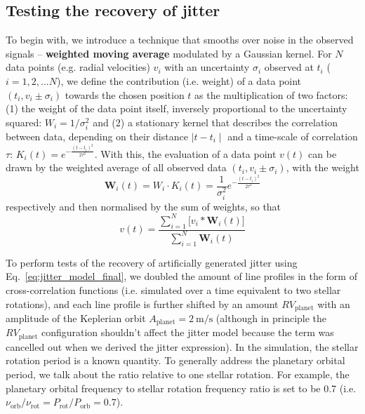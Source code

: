 \subsection{Testing the recovery of jitter}
\label{sec:check}

To begin with, we introduce a technique that smooths over noise in the observed signals -- \textbf{weighted moving average} modulated by a Gaussian kernel. For $N$ data points (e.g. radial velocities) $v_i$ with an uncertainty $\sigma_i$ observed at $t_i$ ($i=1,2,...N$), we define the contribution (i.e. weight) of a data point $(t_i, v_i\pm \sigma_i)$ towards the chosen position $t$ as the multiplication of two factors: (1) the weight of the data point itself, inversely proportional to the uncertainty squared: $W_i= 1/{\sigma_i^2}$ and (2) a stationary kernel that describes the correlation between data, depending on their distance $\mid t-t_i \mid$ and a time-scale of correlation $\tau$: $K_i(t) = e^{-\frac{(t-t_i)^2}{2\tau^2}}$. With this, the evaluation of a data point $v(t)$ can be drawn by the weighted average of all observed data $(t_i, v_i\pm \sigma_i)$, with the weight 
\begin{equation}
	\textbf{W}_i(t) = W_i \cdot K_i(t) = \frac{1}{\sigma_i^2} e^{-\frac{(t-t_i)^2}{2\tau^2}}
\end{equation}
respectively and then normalised by the sum of weights, so that 
\begin{equation}
	v(t) 	=  \frac{\sum\limits_{i=1}^{N} \bigg[v_i*\textbf{W}_i(t)\bigg]}{\sum\limits_{i=1}^{N} \textbf{W}_i(t)}
\end{equation}


To perform tests of the recovery of artificially generated jitter using Eq.~\ref{eq:jitter_model_final}, we doubled the amount of line profiles in the form of cross-correlation functions (i.e. simulated over a time equivalent to two stellar rotations), and each line profile is further shifted by an amount $RV_\text{planet}$ with an amplitude of the Keplerian orbit $A_\text{planet} = 2~\text{m/s}$ (although in principle the $RV_\text{planet}$ configuration shouldn't affect the jitter model because the term was cancelled out when we derived the jitter expression). In the simulation, the stellar rotation period is a known quantity. To generally address the planetary orbital period, we talk about the ratio relative to one stellar rotation. For example, the planetary orbital frequency to stellar rotation frequency ratio is set to be 0.7 (i.e. $\nu_\text{orb}/\nu_\text{rot} = P_\text{rot}/P_\text{orb} = 0.7$). 

